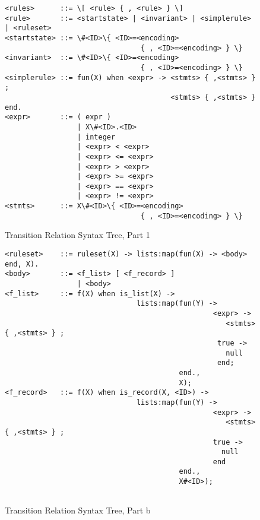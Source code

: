 %
\begin{figure}
\begin{verbatim}
<rules>      ::= \[ <rule> { , <rule> } \]
<rule>       ::= <startstate> | <invariant> | <simplerule> | <ruleset>  
<startstate> ::= \#<ID>\{ <ID>=<encoding> 
                                { , <ID>=<encoding> } \}
<invariant>  ::= \#<ID>\{ <ID>=<encoding> 
                                { , <ID>=<encoding> } \}
<simplerule> ::= fun(X) when <expr> -> <stmts> { ,<stmts> } ; 
                                       <stmts> { ,<stmts> } end.  
<expr>       ::= ( expr )
                 | X\#<ID>.<ID>
                 | integer
                 | <expr> < <expr>
                 | <expr> <= <expr>
                 | <expr> > <expr>
                 | <expr> >= <expr>
                 | <expr> == <expr>
                 | <expr> != <expr>
<stmts>      ::= X\#<ID>\{ <ID>=<encoding> 
                                { , <ID>=<encoding> } \}

\end{verbatim}
\caption{Transition Relation Syntax Tree, Part 1}
\label{TRsta}
\end{figure}
\begin{figure}
\begin{verbatim}
<ruleset>    ::= ruleset(X) -> lists:map(fun(X) -> <body> end, X).
<body>       ::= <f_list> [ <f_record> ]
                 | <body>
<f_list>     ::= f(X) when is_list(X) ->
                               lists:map(fun(Y) -> 
                                                 <expr> -> 
                                                    <stmts> { ,<stmts> } ;  
                                                  true ->
                                                    null
                                                  end; 
                                         end., 
                                         X);
<f_record>   ::= f(X) when is_record(X, <ID>) ->
                               lists:map(fun(Y) -> 
                                                 <expr> -> 
                                                    <stmts> { ,<stmts> } ;  
                                                 true ->
                                                   null
                                                 end 
                                         end., 
                                         X#<ID>);
  

\end{verbatim}
\caption{Transition Relation Syntax Tree, Part b}
\label{TRstb}
\end{figure}

